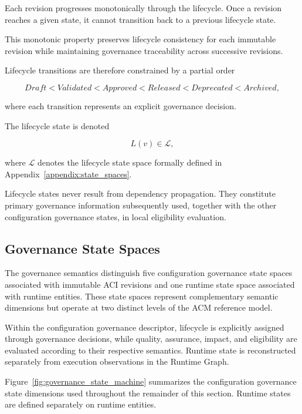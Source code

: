 \documentclass[10pt]{article}
\begin{document}
Each revision progresses monotonically through the lifecycle. Once a revision reaches a given state, it cannot transition back to a previous lifecycle state.

This monotonic property preserves lifecycle consistency for each immutable revision while maintaining governance traceability across successive revisions.

Lifecycle transitions are therefore constrained by a partial order

\begin{equation}
	Draft
	<
	Validated
	<
	Approved
	<
	Released
	<
	Deprecated
	<
	Archived,
	\label{eq:lifecycle_order}
\end{equation}

where each transition represents an explicit governance decision.

The lifecycle state is denoted

\begin{equation}
	L(v)\in\mathcal{L},
	\label{eq:lifecycle_state}
\end{equation}

where $\mathcal{L}$ denotes the lifecycle state space formally defined in Appendix~\ref{appendix:state_spaces}.

Lifecycle states never result from dependency propagation. They constitute primary governance information subsequently used, together with the other configuration governance states, in local eligibility evaluation.

\subsection{Governance State Spaces}
\label{sec:governance_state_spaces}

The governance semantics distinguish five configuration governance state spaces associated with immutable ACI revisions and one runtime state space associated with runtime entities. These state spaces represent complementary semantic dimensions but operate at two distinct levels of the ACM reference model.

Within the configuration governance descriptor, lifecycle is explicitly assigned through governance decisions, while quality, assurance, impact, and eligibility are evaluated according to their respective semantics. Runtime state is reconstructed separately from execution observations in the Runtime Graph.

Figure~\ref{fig:governance_state_machine} summarizes the configuration
governance state dimensions used throughout the remainder of this section.
Runtime states are defined separately on runtime entities.
\end{document}
